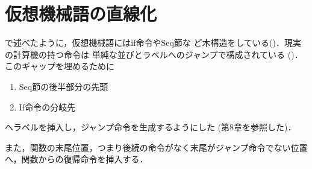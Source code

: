 \documentclass[a4paper,titlepage,disablejfam]{jsbook}
\begin{document}
\section{仮想機械語の直線化}\label{sc:impl-basicblock}
 で述べたように，仮想機械語にはif命令やSeq節な
 ど木構造をしている()．現実の計算機の持つ命令は
 単純な並びとラベルへのジャンプで構成されている
 ()．このギャップを埋めるために
 \begin{enumerate}
  \item Seq節の後半部分の先頭
  \item If命令の分岐先
 \end{enumerate}
 へラベルを挿入し，ジャンプ命令を生成するようにした
 (\cite{Apeel:2009-10-30}第8章を参照した)．

 また，関数の末尾位置，つまり後続の命令がなく末尾がジャンプ命令でない位置
 へ，関数からの復帰命令を挿入する．
\end{document}
